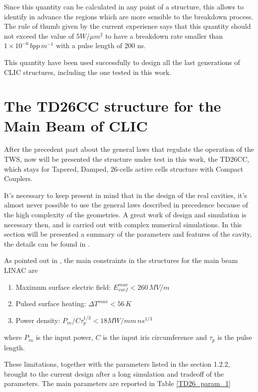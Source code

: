 Since this quantity can be calculated in any point of a structure, this allows to identify in advance the regions which are more sensible to the breakdown process. The rule of thumb given by the current experience says that this quantity should not exceed the value of $5 W/\mu m^2$ to have a breakdown rate smaller than $1\times 10^{-6} \, bpp \, m^{-1}$ with a pulse length of 200 ns.

This quantity have been used successfully to design all the last generations of CLIC structures, including the one tested in this work.






\section[The TD26CC structure for the Main Beam of CLIC]{The TD26CC structure for the Main Beam of CLIC}

After the precedent part about the general laws that regulate the operation of the TWS, now will be presented the structure under test in this work, the TD26CC, which stays for Tapered, Damped, 26-cells active cells structure with Compact Couplers.

It's necessary to keep present in mind that in the design of the real cavities, it's almost never possible to use the general laws described in precedence because of the high complexity of the geometries. A great work of design and simulation is necessary then, and is carried out with complex numerical simulations. In this section will be presented a summary of the parameters and features of the cavity, the details can be found in \cite{CLIC:cdr,Grudiev:td26cc,Lunin:1333709}.

As pointed out in \cite{CLIC:cdr}, the main constraints in the structures for the main beam LINAC are 
\begin{enumerate}
\item Maximum surface electric field: $E_{surf}^{max} < 260 \, MV/m$
\item Pulsed surface heating: $\Delta T^{max} < 56 \,K$
\item Power density: $P_{in}/C\tau_p^{1/3} < 18 MW/mm \, ns^{1/3}$
\end{enumerate}
where $P_{in}$ is the input power, $C$ is the input iris circumference and $\tau_p$ is the pulse length.

These limitations, together with the parameters listed in the section 1.2.2, brought to the current design after a long simulation and tradeoff of the parameters. The main parameters are reported in Table \ref{TD26_param_1}

